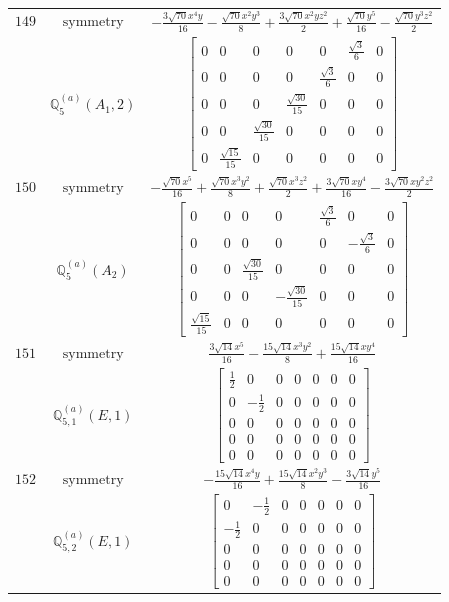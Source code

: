 \documentclass[fleqn,8pt,landscape]{jsarticle}
\begin{document}
\begin{longtable}{ccc}
$ 149 $ & $ \text{symmetry} $ & $ - \frac{3 \sqrt{70} x^{4} y}{16} - \frac{\sqrt{70} x^{2} y^{3}}{8} + \frac{3 \sqrt{70} x^{2} y z^{2}}{2} + \frac{\sqrt{70} y^{5}}{16} - \frac{\sqrt{70} y^{3} z^{2}}{2} $ \\
$  $ & $ \mathbb{Q}_{5}^{(a)}(A_{1},2) $ & $ \begin{bmatrix} 0 & 0 & 0 & 0 & 0 & \frac{\sqrt{3}}{6} & 0 \\ 0 & 0 & 0 & 0 & \frac{\sqrt{3}}{6} & 0 & 0 \\ 0 & 0 & 0 & \frac{\sqrt{30}}{15} & 0 & 0 & 0 \\ 0 & 0 & \frac{\sqrt{30}}{15} & 0 & 0 & 0 & 0 \\ 0 & \frac{\sqrt{15}}{15} & 0 & 0 & 0 & 0 & 0 \end{bmatrix} $ \\ \hline
$ 150 $ & $ \text{symmetry} $ & $ - \frac{\sqrt{70} x^{5}}{16} + \frac{\sqrt{70} x^{3} y^{2}}{8} + \frac{\sqrt{70} x^{3} z^{2}}{2} + \frac{3 \sqrt{70} x y^{4}}{16} - \frac{3 \sqrt{70} x y^{2} z^{2}}{2} $ \\
$  $ & $ \mathbb{Q}_{5}^{(a)}(A_{2}) $ & $ \begin{bmatrix} 0 & 0 & 0 & 0 & \frac{\sqrt{3}}{6} & 0 & 0 \\ 0 & 0 & 0 & 0 & 0 & - \frac{\sqrt{3}}{6} & 0 \\ 0 & 0 & \frac{\sqrt{30}}{15} & 0 & 0 & 0 & 0 \\ 0 & 0 & 0 & - \frac{\sqrt{30}}{15} & 0 & 0 & 0 \\ \frac{\sqrt{15}}{15} & 0 & 0 & 0 & 0 & 0 & 0 \end{bmatrix} $ \\ \hline
$ 151 $ & $ \text{symmetry} $ & $ \frac{3 \sqrt{14} x^{5}}{16} - \frac{15 \sqrt{14} x^{3} y^{2}}{8} + \frac{15 \sqrt{14} x y^{4}}{16} $ \\
$  $ & $ \mathbb{Q}_{5,1}^{(a)}(E,1) $ & $ \begin{bmatrix} \frac{1}{2} & 0 & 0 & 0 & 0 & 0 & 0 \\ 0 & - \frac{1}{2} & 0 & 0 & 0 & 0 & 0 \\ 0 & 0 & 0 & 0 & 0 & 0 & 0 \\ 0 & 0 & 0 & 0 & 0 & 0 & 0 \\ 0 & 0 & 0 & 0 & 0 & 0 & 0 \end{bmatrix} $ \\ \hline
$ 152 $ & $ \text{symmetry} $ & $ - \frac{15 \sqrt{14} x^{4} y}{16} + \frac{15 \sqrt{14} x^{2} y^{3}}{8} - \frac{3 \sqrt{14} y^{5}}{16} $ \\
$  $ & $ \mathbb{Q}_{5,2}^{(a)}(E,1) $ & $ \begin{bmatrix} 0 & - \frac{1}{2} & 0 & 0 & 0 & 0 & 0 \\ - \frac{1}{2} & 0 & 0 & 0 & 0 & 0 & 0 \\ 0 & 0 & 0 & 0 & 0 & 0 & 0 \\ 0 & 0 & 0 & 0 & 0 & 0 & 0 \\ 0 & 0 & 0 & 0 & 0 & 0 & 0 \end{bmatrix} $ \\ \hline

\end{longtable}
\end{document}

